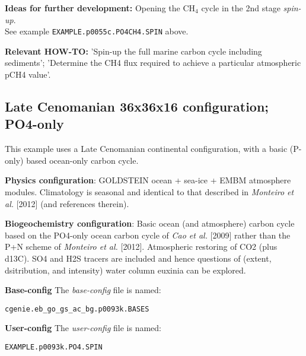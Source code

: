 \documentclass[10pt,twoside]{article}
\begin{document}
\noindent \textbf{Ideas for further development:} Opening the CH$_{4}$ cycle in the 2nd stage \textit{spin-up}. 
\\ See example \texttt{EXAMPLE.p0055c.PO4CH4.SPIN} above.

\noindent \textbf{Relevant HOW-TO:} 'Spin-up the full marine carbon cycle including sediments'; 'Determine the CH4 flux required to achieve a particular atmospheric pCH4 value'.


\subsection{Late Cenomanian 36x36x16 configuration; PO4-only}\label{EXAMPLE.p0093k.PO4.SPIN}

This example uses a Late Cenomanian continental configuration, with a basic (P-only) based ocean-only carbon cycle.

\noindent \textbf{Physics configuration}: GOLDSTEIN ocean + sea-ice + EMBM atmosphere modules. Climatology is seasonal and identical to that described in \textit{Monteiro et al.} [2012] (and references therein).

\noindent \textbf{Biogeochemistry configuration}: Basic ocean (and atmosphere) carbon cycle based on the PO4-only ocean carbon cycle of \textit{Cao et al.} [2009] rather than the P+N scheme of \textit{Monteiro et al.} [2012]. Atmospheric restoring of CO2 (plus d13C). SO4 and H2S tracers are included and hence questions of (extent, dsitribution, and intensity) water column euxinia can be explored.

\noindent \textbf{Base-config} The \textit{base-config} file is named:
\vspace{-10pt}\begin{verbatim}cgenie.eb_go_gs_ac_bg.p0093k.BASES\end{verbatim}\vspace{-10pt}

\noindent \textbf{User-config} The \textit{user-config} file is named:
\vspace{-10pt}\begin{verbatim}EXAMPLE.p0093k.PO4.SPIN\end{verbatim}\vspace{-10pt}
\end{document}
